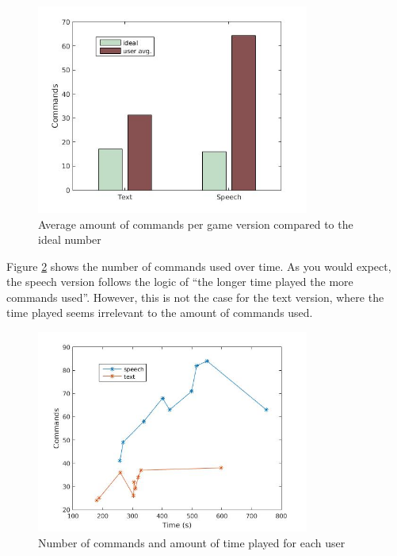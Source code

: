 \begin{figure}[h!]
  \centering
  \includegraphics[width=0.8\textwidth]{images/ideal_cmd.jpg}
  \caption{Average amount of commands per game version compared to the ideal number}\label{ideal_cmd}
\end{figure}

Figure \ref{time_cmd} shows the number of commands used over time. As you would expect, the speech version follows the logic of ``the longer time played the more commands used''. However, this is not the case for the text version, where the time played seems irrelevant to the amount of commands used.

\begin{figure}[h!]
  \centering
  \includegraphics[width=0.8\textwidth]{images/time_cmd.jpg} %
  \caption{Number of commands and amount of time played for each user}\label{time_cmd}
\end{figure}

